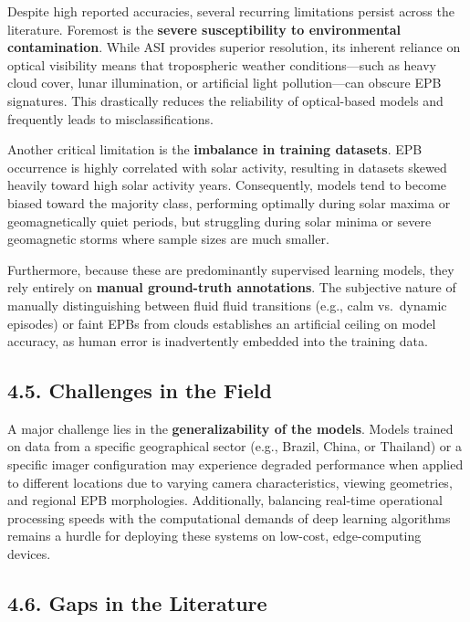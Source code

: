 Despite high reported accuracies, several recurring limitations persist
across the literature. Foremost is the \textbf{severe susceptibility to
environmental contamination}. While ASI provides superior resolution,
its inherent reliance on optical visibility means that tropospheric
weather conditions---such as heavy cloud cover, lunar illumination, or
artificial light pollution---can obscure EPB signatures. This
drastically reduces the reliability of optical-based models and
frequently leads to misclassifications.

Another critical limitation is the \textbf{imbalance in training
datasets}. EPB occurrence is highly correlated with solar activity,
resulting in datasets skewed heavily toward high solar activity years.
Consequently, models tend to become biased toward the majority class,
performing optimally during solar maxima or geomagnetically quiet
periods, but struggling during solar minima or severe geomagnetic storms
where sample sizes are much smaller.

Furthermore, because these are predominantly supervised learning models,
they rely entirely on \textbf{manual ground-truth annotations}. The
subjective nature of manually distinguishing between fluid fluid
transitions (e.g., calm vs.~dynamic episodes) or faint EPBs from clouds
establishes an artificial ceiling on model accuracy, as human error is
inadvertently embedded into the training data.

\hypertarget{challenges-in-the-field}{%
\subsection{4.5. Challenges in the
Field}\label{challenges-in-the-field}}

A major challenge lies in the \textbf{generalizability of the models}.
Models trained on data from a specific geographical sector (e.g.,
Brazil, China, or Thailand) or a specific imager configuration may
experience degraded performance when applied to different locations due
to varying camera characteristics, viewing geometries, and regional EPB
morphologies. Additionally, balancing real-time operational processing
speeds with the computational demands of deep learning algorithms
remains a hurdle for deploying these systems on low-cost, edge-computing
devices.

\hypertarget{gaps-in-the-literature}{%
\subsection{4.6. Gaps in the Literature}\label{gaps-in-the-literature}}

